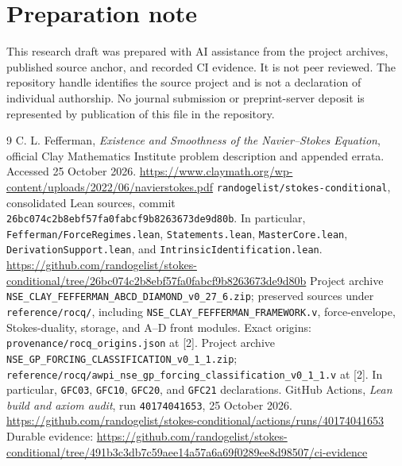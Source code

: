 \documentclass[11pt,a4paper]{article}
\theoremstyle{remark}\newtheorem{remark}[proposition]{Remark}
\newcommand{\code}[1]{\nolinkurl{#1}}
\begin{document}
\section*{Preparation note}
This research draft was prepared with AI assistance from the project archives, published source anchor, and recorded CI evidence. It is not peer reviewed. The repository handle identifies the source project and is not a declaration of individual authorship. No journal submission or preprint-server deposit is represented by publication of this file in the repository.

\begin{thebibliography}{9}\small
{} C. L. Fefferman, \emph{Existence and Smoothness of the Navier--Stokes Equation}, official Clay Mathematics Institute problem description and appended errata. Accessed 25 October 2026.\newline
\url{https://www.claymath.org/wp-content/uploads/2022/06/navierstokes.pdf}
 \texttt{randogelist/stokes-conditional}, consolidated Lean sources, commit \code{26bc074c2b8ebf57fa0fabcf9b8263673de9d80b}. In particular, \code{Fefferman/ForceRegimes.lean}, \code{Statements.lean}, \code{MasterCore.lean}, \code{DerivationSupport.lean}, and \code{IntrinsicIdentification.lean}.\newline
\url{https://github.com/randogelist/stokes-conditional/tree/26bc074c2b8ebf57fa0fabcf9b8263673de9d80b}
 Project archive \code{NSE_CLAY_FEFFERMAN_ABCD_DIAMOND_v0_27_6.zip}; preserved sources under \code{reference/rocq/}, including \code{NSE_CLAY_FEFFERMAN_FRAMEWORK.v}, force-envelope, Stokes-duality, storage, and A--D front modules. Exact origins: \code{provenance/rocq_origins.json} at [2].
 Project archive \code{NSE_GP_FORCING_CLASSIFICATION_v0_1_1.zip}; \code{reference/rocq/awpi_nse_gp_forcing_classification_v0_1_1.v} at [2]. In particular, \code{GFC03}, \code{GFC10}, \code{GFC20}, and \code{GFC21} declarations.
 GitHub Actions, \emph{Lean build and axiom audit}, run \code{40174041653}, 25 October 2026.\newline
\url{https://github.com/randogelist/stokes-conditional/actions/runs/40174041653}\newline
Durable evidence: \url{https://github.com/randogelist/stokes-conditional/tree/491b3c3db7c59aee14a57a6a69f0289ee8d98507/ci-evidence}
\end{thebibliography}
\end{document}
